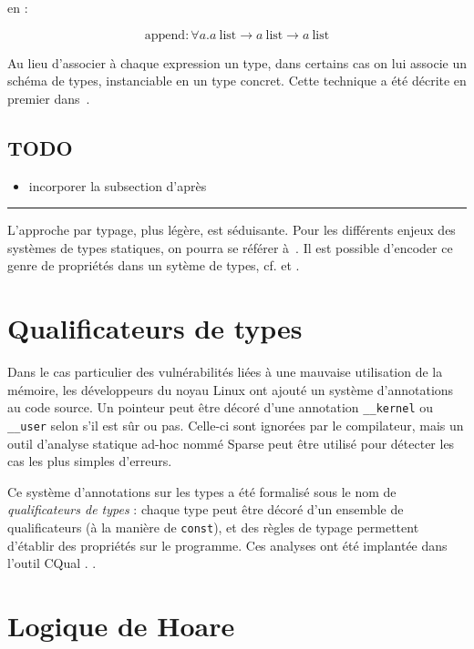 en :

\[ \textrm{append} : ∀ a.
   a~\textrm{list} → a~\textrm{list} → a~\textrm{list}
\]

Au lieu d'associer à chaque expression un type, dans certains cas on lui associe
un schéma de types, instanciable en un type concret. Cette technique a été
décrite en premier dans~\cite{Milner78}.

\subsection*{TODO}

\begin{itemize}
\item
  incorporer la subsection d'après
\end{itemize}

\begin{center}\rule{3in}{0.4pt}\end{center}

L'approche par typage, plus légère, est séduisante. Pour les différents enjeux
des systèmes de types statiques, on pourra se référer à~\cite{TAPL}. Il est
possible d'encoder ce genre de propriétés dans un sytème de types, cf.
\cite{lightweight-static-capabilities} et \cite{LZ06a}.

\section{Qualificateurs de types}

Dans le cas particulier des vulnérabilités liées à une mauvaise utilisation de
la mémoire, les développeurs du noyau Linux ont ajouté un système d'annotations
au code source. Un pointeur peut être décoré d'une annotation
\texttt{\_\_kernel} ou \texttt{\_\_user} selon s'il est sûr ou pas. Celle-ci
sont ignorées par le compilateur, mais un outil d'analyse statique ad-hoc nommé
Sparse  peut être utilisé pour détecter les cas les plus simples
d'erreurs.

Ce système d'annotations sur les types a été formalisé sous le nom de
\emph{qualificateurs de types} : chaque type peut être décoré d'un ensemble de
qualificateurs (à la manière de \texttt{const}), et des règles de typage
permettent d'établir des propriétés sur le programme. Ces analyses ont été
implantée dans l'outil CQual
\cite{pldi99,usenix01,pldi02,cquk-usenix04,toplas-quals}. .

\section{Logique de Hoare}

